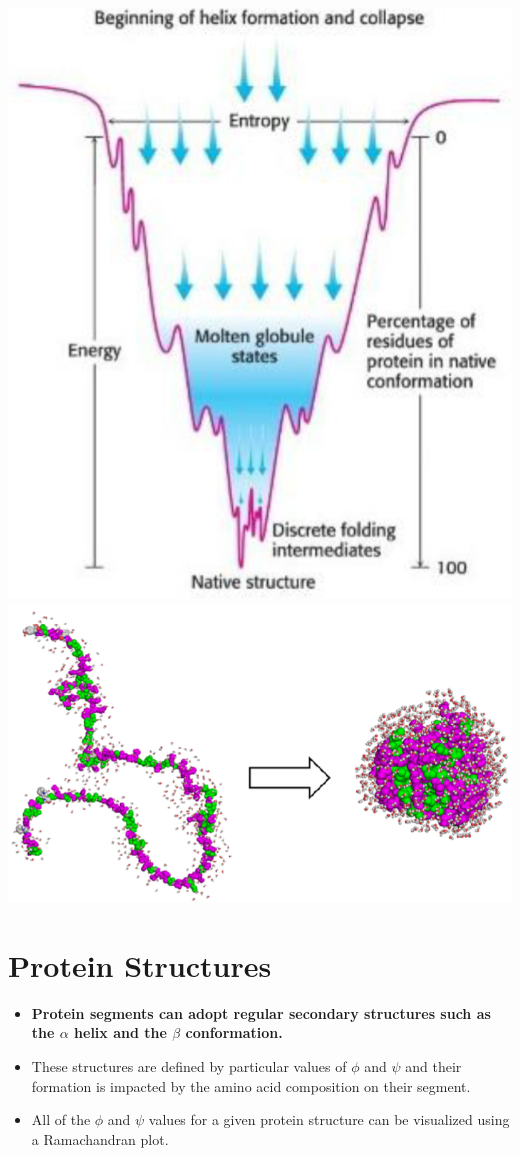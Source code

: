 \documentclass[10pt]{article}
\begin{document}
\begin{center}
    \includegraphics*[scale=0.5]{L1_8.png}
    \includegraphics*[scale=0.5]{L1_9.png}
\end{center}


\section*{Protein Structures}
\begin{itemize}
    \item \textbf{Protein segments can adopt regular secondary structures such as the $\alpha$ helix and the $\beta$ conformation.}
    \item These structures are defined by particular values of $\phi$ and $\psi$ and their formation is impacted by the amino acid composition on their segment.
    \item All of the $\phi$ and $\psi$ values for a given protein structure can be visualized using a Ramachandran plot.
\end{itemize}
\end{document}
